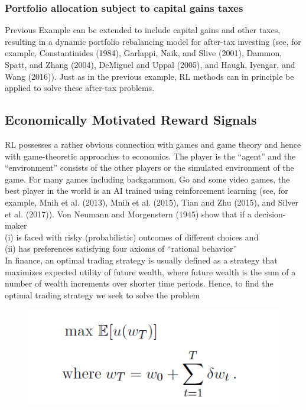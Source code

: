 \documentclass{article}
\begin{document}
\subsubsection{Portfolio allocation subject to capital gains taxes}
Previous Example can be extended to include capital gains and other taxes, resulting in a dynamic portfolio rebalancing model for after-tax investing (see, for example, Constantinides (1984), Garlappi, Naik, and Slive (2001), Dammon, Spatt, and Zhang (2004), DeMiguel and Uppal (2005), and Haugh, Iyengar, and Wang (2016)). Just as in the previous example, RL methods can in principle be applied to solve these after-tax problems.

\subsection{Economically Motivated Reward Signals}
RL possesses a rather obvious connection with games and game theory and hence with game-theoretic approaches to economics. The player is the “agent” and the “environment” consists of the other players or the simulated environment of the game. For many games including backgammon, Go and some video games, the best player in the world is an AI trained using reinforcement learning (see, for example, Mnih et al. (2013), Mnih et al. (2015), Tian and Zhu (2015), and Silver et al. (2017)). Von Neumann and Morgenstern (1945) show that if a decision-maker\\
(i) is faced with risky (probabilistic) outcomes of different choices and\\
(ii) has preferences satisfying four axioms of “rational behavior”\\

In finance, an optimal trading strategy is usually defined as a strategy that maximizes expected utility of future wealth, where future wealth is the sum of a number of wealth increments over shorter time periods. Hence, to find the optimal trading strategy we seek to solve the problem

\begin{figure}[H]
\begin{center}
\includegraphics[scale = 0.5]{Mod.png}
\end{center}
\end{figure}
\end{document}
